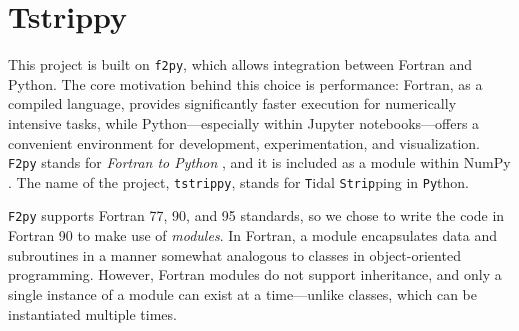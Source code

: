 \documentclass{article}
\begin{document}
\section{Tstrippy}

    This project is built on \texttt{f2py}, which allows integration between Fortran and Python. The core motivation behind this choice is performance: Fortran, as a compiled language, provides significantly faster execution for numerically intensive tasks, while Python—especially within Jupyter notebooks—offers a convenient environment for development, experimentation, and visualization. \texttt{F2py} stands for \textit{Fortran to Python} \citep{peterson2009f2py}, and it is included as a module within NumPy \citep{numpy_f2py_manual,2020Natur.585..357H}. The name of the project, \texttt{tstrippy}, stands for \texttt{T}idal \texttt{Strip}ping in \texttt{Py}thon.

    \texttt{F2py} supports Fortran 77, 90, and 95 standards, so we chose to write the code in Fortran 90 to make use of \textit{modules}. In Fortran, a module encapsulates data and subroutines in a manner somewhat analogous to classes in object-oriented programming. However, Fortran modules do not support inheritance, and only a single instance of a module can exist at a time—unlike classes, which can be instantiated multiple times.
\end{document}
